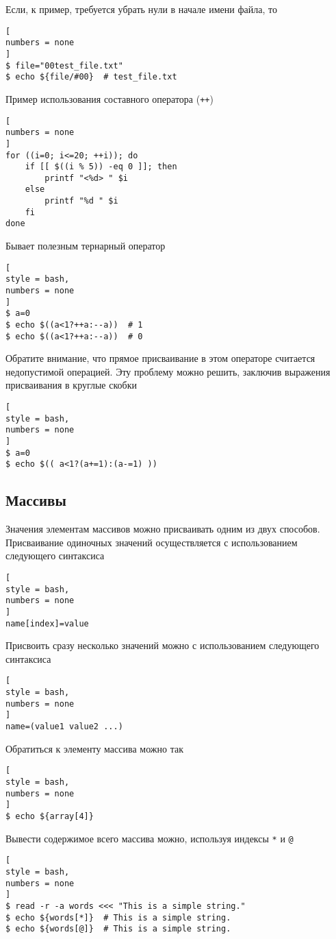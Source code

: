 \documentclass[%
	11pt,
	a4paper,
	utf8,
		]{article}
\begin{document}
Если, к пример, требуется убрать нули в начале имени файла, то
\begin{lstlisting}[
numbers = none
]
$ file="00test_file.txt"
$ echo ${file/#00}  # test_file.txt
\end{lstlisting}

Пример использования составного оператора (\verb|++|)
\begin{lstlisting}[
numbers = none
]
for ((i=0; i<=20; ++i)); do
    if [[ $((i % 5)) -eq 0 ]]; then
        printf "<%d> " $i
    else
        printf "%d " $i
    fi
done
\end{lstlisting}

Бывает полезным тернарный оператор
\begin{lstlisting}[
style = bash,
numbers = none
]
$ a=0
$ echo $((a<1?++a:--a))  # 1
$ echo $((a<1?++a:--a))  # 0
\end{lstlisting}

Обратите внимание, что прямое присваивание в этом операторе считается недопустимой операцией. Эту проблему можно решить, заключив выражения присваивания в круглые скобки
\begin{lstlisting}[
style = bash,
numbers = none
]
$ a=0
$ echo $(( a<1?(a+=1):(a-=1) ))
\end{lstlisting}

\subsection{Массивы}

Значения элементам массивов можно присваивать одним из двух способов. Присваивание одиночных значений осуществляется с использованием следующего синтаксиса
\begin{lstlisting}[
style = bash,
numbers = none
]
name[index]=value
\end{lstlisting}

Присвоить сразу несколько значений можно с использованием следующего синтаксиса
\begin{lstlisting}[
style = bash,
numbers = none
]
name=(value1 value2 ...)
\end{lstlisting}

Обратиться к элементу массива можно так
\begin{lstlisting}[
style = bash,
numbers = none
]
$ echo ${array[4]}
\end{lstlisting}

Вывести содержимое всего массива можно, используя индексы \verb|*| и \verb|@|
\begin{lstlisting}[
style = bash,
numbers = none
]
$ read -r -a words <<< "This is a simple string."
$ echo ${words[*]}  # This is a simple string.
$ echo ${words[@]}  # This is a simple string.
\end{lstlisting}
\end{document}
